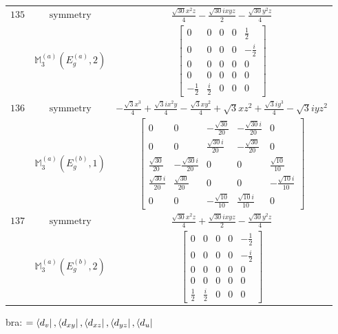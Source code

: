 \documentclass[fleqn,8pt,landscape]{jsarticle}
\begin{document}
\begin{longtable}{ccc}
$ 135 $ & $ \text{symmetry} $ & $ \frac{\sqrt{30} x^{2} z}{4} - \frac{\sqrt{30} i x y z}{2} - \frac{\sqrt{30} y^{2} z}{4} $ \\
$  $ & $ \mathbb{M}_{3}^{(a)}(E_{g}^{(a)},2) $ & $ \begin{bmatrix} 0 & 0 & 0 & 0 & \frac{1}{2} \\ 0 & 0 & 0 & 0 & - \frac{i}{2} \\ 0 & 0 & 0 & 0 & 0 \\ 0 & 0 & 0 & 0 & 0 \\ - \frac{1}{2} & \frac{i}{2} & 0 & 0 & 0 \end{bmatrix} $ \\ \hline
$ 136 $ & $ \text{symmetry} $ & $ - \frac{\sqrt{3} x^{3}}{4} + \frac{\sqrt{3} i x^{2} y}{4} - \frac{\sqrt{3} x y^{2}}{4} + \sqrt{3} x z^{2} + \frac{\sqrt{3} i y^{3}}{4} - \sqrt{3} i y z^{2} $ \\
$  $ & $ \mathbb{M}_{3}^{(a)}(E_{g}^{(b)},1) $ & $ \begin{bmatrix} 0 & 0 & - \frac{\sqrt{30}}{20} & - \frac{\sqrt{30} i}{20} & 0 \\ 0 & 0 & \frac{\sqrt{30} i}{20} & - \frac{\sqrt{30}}{20} & 0 \\ \frac{\sqrt{30}}{20} & - \frac{\sqrt{30} i}{20} & 0 & 0 & \frac{\sqrt{10}}{10} \\ \frac{\sqrt{30} i}{20} & \frac{\sqrt{30}}{20} & 0 & 0 & - \frac{\sqrt{10} i}{10} \\ 0 & 0 & - \frac{\sqrt{10}}{10} & \frac{\sqrt{10} i}{10} & 0 \end{bmatrix} $ \\ \hline
$ 137 $ & $ \text{symmetry} $ & $ \frac{\sqrt{30} x^{2} z}{4} + \frac{\sqrt{30} i x y z}{2} - \frac{\sqrt{30} y^{2} z}{4} $ \\
$  $ & $ \mathbb{M}_{3}^{(a)}(E_{g}^{(b)},2) $ & $ \begin{bmatrix} 0 & 0 & 0 & 0 & - \frac{1}{2} \\ 0 & 0 & 0 & 0 & - \frac{i}{2} \\ 0 & 0 & 0 & 0 & 0 \\ 0 & 0 & 0 & 0 & 0 \\ \frac{1}{2} & \frac{i}{2} & 0 & 0 & 0 \end{bmatrix} $ \\ \hline
\end{longtable}
bra: $=\bra{d_{v}}, \bra{d_{xy}}, \bra{d_{xz}}, \bra{d_{yz}}, \bra{d_{u}}$
\end{document}
